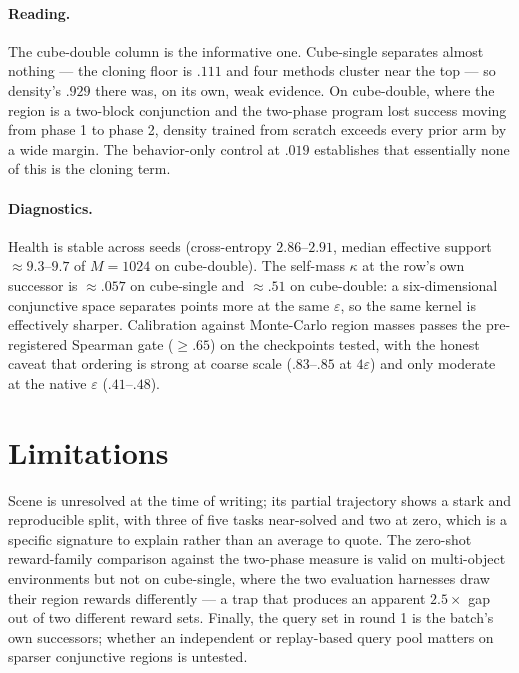 \documentclass{article}
\begin{document}
\paragraph{Reading.} The cube-double column is the informative one. Cube-single separates
almost nothing --- the cloning floor is $.111$ and four methods cluster near the top --- so
density's $.929$ there was, on its own, weak evidence. On cube-double, where the region is
a two-block conjunction and the two-phase program lost success moving from phase 1 to phase
2, density trained from scratch exceeds every prior arm by a wide margin. The behavior-only
control at $.019$ establishes that essentially none of this is the cloning term.

\paragraph{Diagnostics.} Health is stable across seeds (cross-entropy $2.86$--$2.91$,
median effective support ${\approx}9.3$--$9.7$ of $M{=}1024$ on cube-double). The
self-mass $\kappa$ at the row's own successor is ${\approx}.057$ on cube-single and
${\approx}.51$ on cube-double: a six-dimensional conjunctive space separates points more at
the same $\varepsilon$, so the same kernel is effectively sharper. Calibration against
Monte-Carlo region masses passes the pre-registered Spearman gate ($\ge.65$) on the
checkpoints tested, with the honest caveat that ordering is strong at coarse scale
($.83$--$.85$ at $4\varepsilon$) and only moderate at the native $\varepsilon$
($.41$--$.48$).

\section{Limitations}

Scene is unresolved at the time of writing; its partial trajectory shows a stark and
reproducible split, with three of five tasks near-solved and two at zero, which is a
specific signature to explain rather than an average to quote. The zero-shot reward-family
comparison against the two-phase measure is valid on multi-object environments but not on
cube-single, where the two evaluation harnesses draw their region rewards differently ---
a trap that produces an apparent $2.5\times$ gap out of two different reward sets. Finally,
the query set in round 1 is the batch's own successors; whether an independent or
replay-based query pool matters on sparser conjunctive regions is untested.
\end{document}
